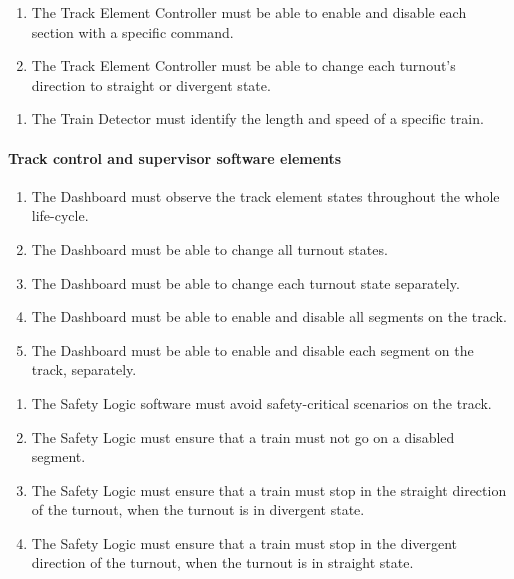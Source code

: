 \begin{enumerate}[label=REQ-TEC-\arabic*, leftmargin=*, format=\small]
	\item The Track Element Controller must be able to enable and disable each section with a specific command. \label{req:TEC-1}
	\item The Track Element Controller must be able to change each turnout's direction to straight or divergent state. \label{req:TEC-2}
\end{enumerate}

\begin{enumerate}[label=REQ-TD-\arabic*, leftmargin=*, format=\small]
	\item The Train Detector must identify the length and speed of a specific train. \label{req:TD}
\end{enumerate}

\paragraph{Track control and supervisor software elements}

\begin{enumerate}[label=REQ-DB-\arabic*, leftmargin=*, format=\small]
	\item The Dashboard must observe the track element states throughout the whole life-cycle. \label{req:DB-1}
	\item The Dashboard must be able to change all turnout states. \label{req:DB-2}
	\item The Dashboard must be able to change each turnout state separately. \label{req:DB-3}
	\item The Dashboard must be able to enable and disable all segments on the track. \label{req:DB-4}
	\item The Dashboard must be able to enable and disable each segment on the track, separately. \label{req:DB-5}
\end{enumerate}


\begin{enumerate}[label=REQ-SL-\arabic*, leftmargin=*, format=\small]
	\item The Safety Logic software must avoid safety-critical scenarios on the track. \label{req:SL-1}
	\item The Safety Logic must ensure that a train must not go on a disabled segment. \label{req:SL-2}
	\item The Safety Logic must ensure that a train must stop in the straight direction of the turnout, when the turnout is in divergent state. \label{req:SL-3}
	\item The Safety Logic must ensure that a train must stop in the divergent direction of the turnout, when the turnout is in straight state. \label{req:SL-4}
\end{enumerate}
	


